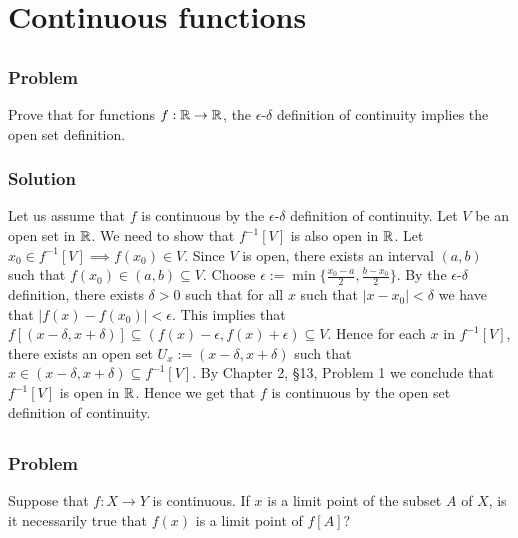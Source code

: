 \setcounter{section}{17} %
\section{Continuous functions}
\label{sec-topspace-continuous}


\subsection{}

\subsubsection{Problem}
Prove that for functions $f : \mathbb R \to \mathbb R$, the $\epsilon$-$\delta$ definition of continuity implies the open set definition.

\subsubsection{Solution}
Let us assume that $f$ is continuous by the $\epsilon$-$\delta$ definition of continuity. Let $V$ be an open set in $\mathbb R$. We need to show that $f^{-1}[V]$ is also open in $\mathbb R$. Let $x_0 \in f^{-1}[V] \implies f(x_0) \in V$. Since $V$ is open, there exists an interval $(a, b)$ such that $f(x_0) \in (a, b) \subseteq V$. Choose $\epsilon := \min\{\tfrac{x_0-a}{2}, \tfrac{b-x_0}{2}\}$. By the $\epsilon$-$\delta$ definition, there exists $\delta > 0$ such that for all $x$ such that $|x-x_0| < \delta$ we have that $|f(x)-f(x_0)| < \epsilon$. This implies that $f[(x-\delta, x+\delta)] \subseteq (f(x)-\epsilon, f(x)+\epsilon) \subseteq V$. Hence for each $x$ in $f^{-1}[V]$, there exists an open set $U_x := (x-\delta, x+\delta)$ such that $x \in (x-\delta, x+\delta) \subseteq f^{-1}[V]$. By Chapter 2, \S 13, Problem 1 we conclude that $f^{-1}[V]$ is open in $\mathbb R$. Hence we get that $f$ is continuous by the open set definition of continuity.


\subsection{}

\subsubsection{Problem}
Suppose that $f : X \to Y$ is continuous. If $x$ is a limit point of the subset $A$ of $X$, is it necessarily true that $f(x)$ is a limit point of $f[A]$?

